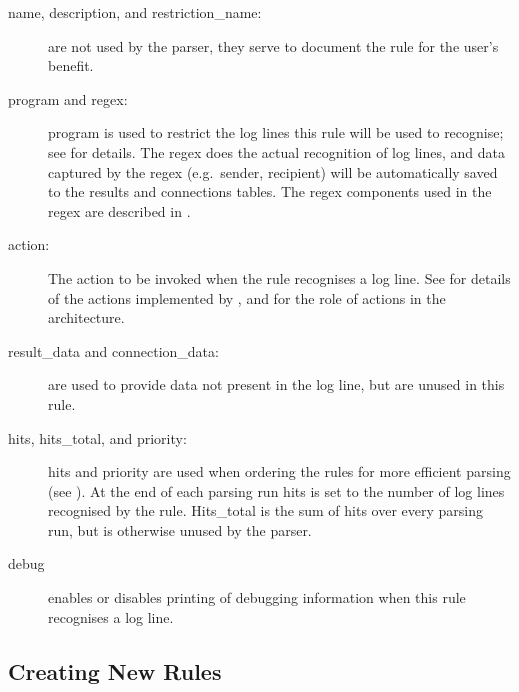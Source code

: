 \begin{description}

    \item [name, description, and restriction\_name:] are not used by the
        parser, they serve to document the rule for the user's benefit.

    \item [program and regex:] program is used to restrict the log lines
        this rule will be used to recognise; see  for details.  The regex does the
        actual recognition of log lines, and data captured by the regex
        (e.g.\ sender, recipient) will be automatically saved to the
        results and connections tables.  The regex components used in the
        regex are described in .

    \item [action:] The action to be invoked when the rule recognises a log
        line.  See  for
        details of the actions implemented by \parsername{}, and
         for the role of actions in the
        architecture.

    \item [result\_data and connection\_data:] are used to provide data not
        present in the log line, but are unused in this rule.

    \item [hits, hits\_total, and priority:] hits and priority are used
        when ordering the rules for more efficient parsing (see
        ).  At the end of each
        parsing run hits is set to the number of log lines recognised by
        the rule.  Hits\_total is the sum of hits over every parsing run,
        but is otherwise unused by the parser.

    \item [debug] enables or disables printing of debugging information
        when this rule recognises a log line.

\end{description}

\subsection{Creating New Rules}

\label{creating new rules in implementation}

